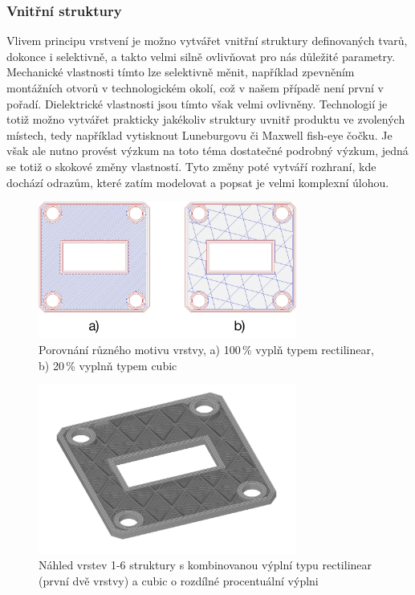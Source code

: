 \subsubsection{Vnitřní struktury}
Vlivem principu vrstvení je možno vytvářet vnitřní struktury definovaných tvarů, dokonce i selektivně, a takto velmi silně ovlivňovat pro nás důležité parametry.
Mechanické vlastnosti tímto lze selektivně měnit, například zpevněním montážních otvorů v technologickém okolí, což v našem případě není první v pořadí.
Dielektrické vlastnosti jsou tímto však velmi ovlivněny. Technologií je totiž možno vytvářet prakticky jakékoliv struktury uvnitř produktu ve zvolených místech, tedy například vytisknout Luneburgovu či Maxwell fish-eye čočku. Je však ale nutno provést výzkum na toto téma dostatečné podrobný výzkum, jedná se totiž o skokové změny vlastností. Tyto změny poté vytváří rozhraní, kde dochází odrazům, které zatím modelovat a popsat je velmi komplexní úlohou.

\begin{figure}[!htbp]
\begin{center}
\includegraphics[width=8.5cm]{pics/fillcompare}
\caption{Porovnání různého motivu vrstvy, a) 100\,\% vyplň typem rectilinear, b) 20\,\% vyplnň typem cubic}
\end{center}
\end{figure}

\begin{figure}[!htbp]
\begin{center}
\includegraphics[width=8.5cm]{pics/6layer}
\caption{Náhled vrstev 1-6 struktury s kombinovanou výplní typu rectilinear (první dvě vrstvy) a cubic o rozdílné procentuální výplni}
\end{center}
\end{figure}

